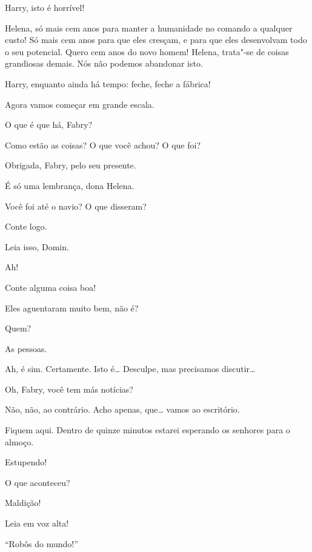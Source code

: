  Harry, isto é horrível!

 Helena, só mais cem anos para manter a humanidade no
comando a qualquer custo! Só mais cem anos para que eles cresçam, e para que
eles desenvolvam todo o seu potencial. Quero cem anos do novo homem! Helena,
trata"-se de coisas grandiosas demais. Nós não podemos abandonar isto.

 Harry, enquanto ainda há tempo: feche, feche a fábrica!

 Agora vamos começar em grande escala.

 O que é que há, Fabry?

 Como estão as coisas? O que você achou? O que foi?

  Obrigada, Fabry, pelo seu presente.

 É só uma lembrança, dona Helena.

 Você foi até o navio? O que disseram?

 Conte logo.

  Leia isso, \mbox{Domin}.

  Ah!

  Conte alguma coisa boa!

 Eles aguentaram muito bem, não é?

 Quem?

 As pessoas.

 Ah, é sim. Certamente. Isto é\ldots{} Desculpe, mas precisamos discutir\ldots{}

 Oh, Fabry, você tem más notícias?

 Não, não, ao contrário. Acho apenas, que\ldots{} vamos ao escritório.

 Fiquem aqui. Dentro de quinze minutos estarei esperando os senhores para o
almoço.

 Estupendo!

 O que aconteceu?

 Maldição!

 Leia em voz alta!

  ``Robôs do mundo!''

